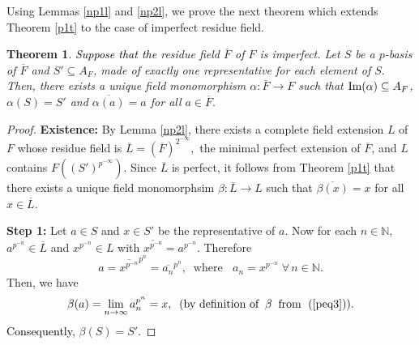 \documentclass[times,10pt]{amsart}
\newcommand{\N}{\ensuremath{\mathbb{N}}}
\newtheorem{thm}{Theorem}[section]
\begin{document}
{Using Lemmas \ref{np1l} and \ref{np2l}, we prove the next theorem which extends Theorem \ref{p1t} {to the case of imperfect residue field}.

\begin{thm}\label{imp}
\textcolor{black}{Suppose \textcolor{black}{that} the} residue field $\overline{F}$ of $F$ is  imperfect. Let $S$ be a $p$-basis of $\overline{F}$ and $S'\subseteq A_F$,  made of  exactly one representative for each element of $S.$ Then, there exists a unique  field monomorphism  $\alpha: \overline{F}\xrightarrow{}F$ such that ${\rm Im}(\alpha)\subseteq A_F$, $\alpha(S)=S'$ and $ \overline{\alpha(a)}=a$ for all $a\in \overline{F}.$    
 \end{thm}

 \begin{proof} \textbf{Existence:} By Lemma \ref{np2l}, there exists a complete field extension $L$ of $F$ whose residue field is $\overline{L}=\left(\overline{F}\right)^{2^{-\infty}},$ the minimal perfect extension of $\overline{F}$, and $L$ contains $F\left(\left(S'\right)^{p^{-\infty}}\right).$ Since $\overline{L}$ is perfect, it follows from Theorem \ref{p1t} that there exists a unique field monomorphsim $\beta: \overline{L}\xrightarrow{} L$ such that $ \overline{ \beta( x)}= x$ for all $x\in \overline{L}.$
\vskip1.5mm
     
     \textbf{Step 1:}  Let $a\in S $ and $x\in S'$ be the representative of $a.$ Now  for each   $n\in \N$, $a^{p^{-n}}\in \overline{L}$ and $ x^{p^{-n}}\in L $  with $ \overline{x^{p^{-n}}}= a^{p^{-n}}$. Therefore$$a= \overline{x^{p^{-n}}}^{p^n}=  \overline{a_n}^{p^n},\;\;\text{where }\;\; a_n= x^{p^{-n}} \; \forall\, n\in \N.$$Then, we have$$\beta(a) = \lim_{n\to \infty} a_n^{p^n}=x,\;\; \text{(by definition of}\;\; \beta\;\; \text{from }\;(\ref{peq3})).$$ \textcolor{black}{Consequently,}  $\beta(S)=S'$.


\end{proof}}
\end{document}
